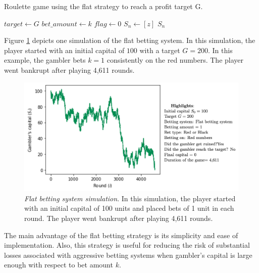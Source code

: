 \documentclass[11pt,twoside]{article}
\numberwithin{Theorem}{section}
\numberwithin{Definition}{section}
\numberwithin{Lemma}{section}
\numberwithin{Algorithm}{section}
\numberwithin{equation}{section}
\begin{document}
\begin{algorithm}
\caption{Roulette game using the flat strategy to reach a profit target G.}\label{alg:1}
\SetAlgoLined
{}

$target \gets G$\;
$bet\_amount \gets k$\;
$flag \gets 0$\;
$S_{n} \gets [z]$\;
\Return $S_{n}$\;
\end{algorithm}
Figure \ref{sim_01} depicts one simulation of the flat betting system. In this simulation, the player started with an initial capital of $100$ with a target $G = 200$. In this example, the gambler bets $k=1$ consistently on the red numbers. The player went bankrupt after playing 4,611 rounds.
\begin{figure}[h]
        \centering
        \includegraphics[width=13 cm]{flat_ex_1.png}
        \caption[Flat betting system simulation]{\textit{Flat betting system simulation}. In this simulation, the player started with an initial capital of 100 units and placed bets of 1 unit in each round. The player went bankrupt after playing 4,611 rounds.}\label{sim_01}
\end{figure}

The main advantage of the flat betting strategy is its simplicity and ease of implementation. Also, this strategy is useful for reducing the risk of substantial losses associated with aggressive betting systems when gambler's capital is large enough with respect to bet amount $k$.
\end{document}
